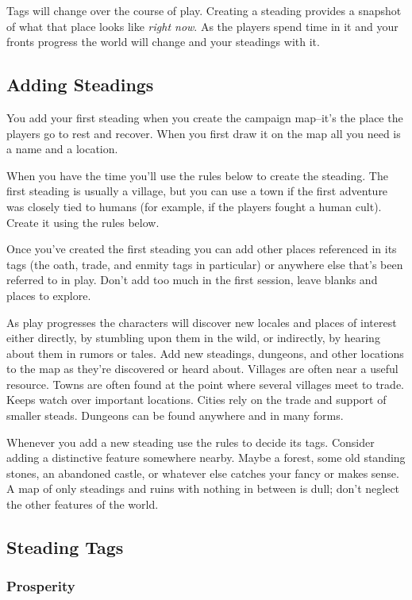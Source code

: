  Tags will change over the course of play. Creating a steading provides a snapshot of what that place looks like \emph{right now}. As the players spend time in it and your fronts progress the world will change and your steadings with it.
\subsection{Adding Steadings}


 You add your first steading when you create the campaign map--it's the place the players go to rest and recover. When you first draw it on the map all you need is a name and a location.


 When you have the time you'll use the rules below to create the steading. The first steading is usually a village, but you can use a town if the first adventure was closely tied to humans (for example, if the players fought a human cult). Create it using the rules below.


 Once you've created the first steading you can add other places referenced in its tags (the oath, trade, and enmity tags in particular) or anywhere else that's been referred to in play. Don't add too much in the first session, leave blanks and places to explore.


 As play progresses the characters will discover new locales and places of interest either directly, by stumbling upon them in the wild, or indirectly, by hearing about them in rumors or tales. Add new steadings, dungeons, and other locations to the map as they're discovered or heard about. Villages are often near a useful resource. Towns are often found at the point where several villages meet to trade. Keeps watch over important locations. Cities rely on the trade and support of smaller steads. Dungeons can be found anywhere and in many forms.


 Whenever you add a new steading use the rules to decide its tags. Consider adding a distinctive feature somewhere nearby. Maybe a forest, some old standing stones, an abandoned castle, or whatever else catches your fancy or makes sense. A map of only steadings and ruins with nothing in between is dull; don't neglect the other features of the world.
\subsection{Steading Tags}
\subsubsection{Prosperity}



